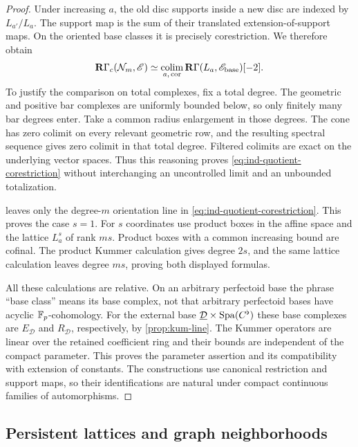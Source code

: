 \begin{proof}
Under increasing $a$, the old disc supports inside a new disc are
indexed by $L_{a'}/L_a$.  The support map is the sum of their translated
extension-of-support maps.  On the oriented base classes it is
precisely corestriction.  We therefore obtain
\begin{equation}
 \label{eq:ind-quotient-corestriction}
 \mathbf R\Gamma_c(\mathcal N_m,\mathscr E)
 \simeq
 \operatorname*{colim}_{a,\,\operatorname{cor}}
       \mathbf R\Gamma(L_a,\mathscr E_{\mathrm{base}})[-2].
\end{equation}
To justify the comparison on total complexes, fix a total degree.
The geometric and positive bar complexes are uniformly bounded
below, so only finitely many bar degrees enter.  Take a common
radius enlargement in those degrees.  The cone has zero colimit on
every relevant geometric row, and the resulting spectral sequence
gives zero colimit in that total degree.  Filtered colimits are exact
on the underlying vector spaces.  Thus this reasoning proves
\cref{eq:ind-quotient-corestriction} without interchanging an
uncontrolled limit and an unbounded totalization.

 leaves only the degree-$m$
orientation line in \cref{eq:ind-quotient-corestriction}.  This proves
the case $s=1$.  For $s$ coordinates use product boxes in the affine
space and the lattice $L_a^s$ of rank $ms$.  Product boxes with a
common increasing bound are cofinal.  The product Kummer calculation
gives degree $2s$, and the same lattice calculation leaves degree
$ms$, proving both displayed formulas.

All these calculations are relative.  On an arbitrary perfectoid
base the phrase ``base class'' means its base complex, not that
arbitrary perfectoid bases have acyclic $\mathbb F_p$-cohomology.  For the
external base $\underline{\mathcal D}\times\operatorname{Spa}(C^\flat)$ these base
complexes are $E_{\mathcal D}$ and $R_{\mathcal D}$, respectively,
by \cref{prop:kum-line}.  The Kummer operators are linear over the
retained coefficient ring and their bounds are independent of the
compact parameter.  This proves the parameter assertion and its
compatibility with extension of constants.  The constructions use
canonical restriction and support maps, so their identifications
are natural under compact continuous families of automorphisms.
\end{proof}

\subsection{Persistent lattices and graph neighborhoods}

